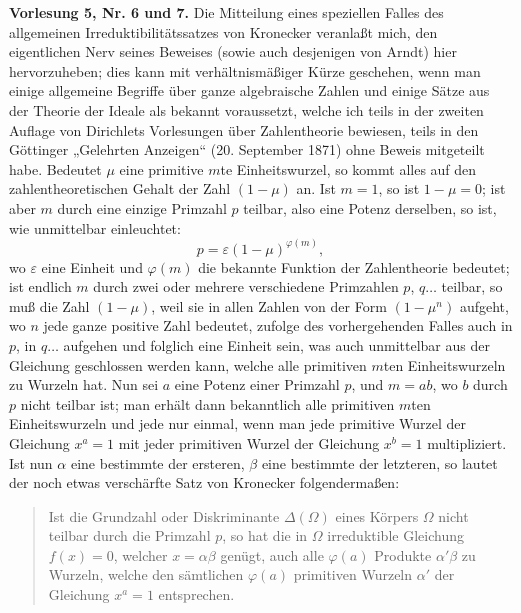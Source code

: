 \documentclass[11pt]{article}
\begin{document}
\textbf{Vorlesung 5, Nr. 6 und 7.} Die Mitteilung eines speziellen Falles des allgemeinen Irreduktibilitätssatzes von Kronecker veranlaßt mich, den eigentlichen Nerv seines Beweises (sowie auch desjenigen von Arndt) hier hervorzuheben; dies kann mit verhältnismäßiger Kürze geschehen, wenn man einige allgemeine Begriffe über ganze algebraische Zahlen und einige Sätze aus der Theorie der Ideale als bekannt voraussetzt, welche ich teils in der zweiten Auflage von Dirichlets Vorlesungen über Zahlentheorie bewiesen, teils in den Göttinger „Gelehrten Anzeigen“ (20. September 1871) ohne Beweis mitgeteilt habe. Bedeutet $\mu$ eine primitive $m$te Einheitswurzel, so kommt alles auf den zahlentheoretischen Gehalt der Zahl $(1-\mu)$ an. Ist $m=1$, so ist $1-\mu=0$; ist aber $m$ durch eine einzige Primzahl $p$ teilbar, also eine Potenz derselben, so ist, wie unmittelbar einleuchtet:
\[
 p=\varepsilon(1-\mu)^{\varphi(m)},
\]
wo $\varepsilon$ eine Einheit und $\varphi(m)$ die bekannte Funktion der Zahlentheorie bedeutet; ist endlich $m$ durch zwei oder mehrere verschiedene Primzahlen $p$, $q\ldots$ teilbar, so muß die Zahl $(1-\mu)$, weil sie in allen Zahlen von der Form $(1-\mu^n)$ aufgeht, wo $n$ jede ganze positive Zahl bedeutet, zufolge des vorhergehenden Falles auch in $p$, in $q\ldots$ aufgehen und folglich eine Einheit sein, was auch unmittelbar aus der Gleichung geschlossen werden kann, welche alle primitiven $m$ten Einheitswurzeln zu Wurzeln hat. Nun sei $a$ eine Potenz einer Primzahl $p$, und $m=ab$, wo $b$ durch $p$ nicht teilbar ist; man erhält dann bekanntlich alle primitiven $m$ten Einheitswurzeln und jede nur einmal, wenn man jede primitive Wurzel der Gleichung $x^a=1$ mit jeder primitiven Wurzel der Gleichung $x^b=1$ multipliziert. Ist nun $\alpha$ eine bestimmte der ersteren, $\beta$ eine bestimmte der letzteren, so lautet der noch etwas verschärfte Satz von Kronecker folgendermaßen:

\begin{quote}
Ist die Grundzahl oder Diskriminante $\Delta(\Omega)$ eines Körpers $\Omega$ nicht teilbar durch die Primzahl $p$, so hat die in $\Omega$ irreduktible Gleichung $f(x)=0$, welcher $x=\alpha\beta$ genügt, auch alle $\varphi(a)$ Produkte $\alpha'\beta$ zu Wurzeln, welche den sämtlichen $\varphi(a)$ primitiven Wurzeln $\alpha'$ der Gleichung $x^a=1$ entsprechen.
\end{quote}
\end{document}
